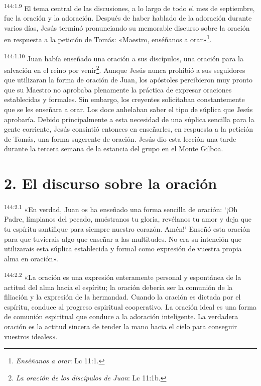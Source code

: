 \par 
\textsuperscript{144:1.9} El tema central de las discusiones, a lo largo de todo el mes de septiembre, fue la oración y la adoración. Después de haber hablado de la adoración durante varios días, Jesús terminó pronunciando su memorable discurso sobre la oración en respuesta a la petición de Tomás: «Maestro, enséñanos a orar»\footnote{\textit{Enséñanos a orar}: Lc 11:1.}.

\par 
\textsuperscript{144:1.10} Juan había enseñado una oración a sus discípulos, una oración para la salvación en el reino por venir\footnote{\textit{La oración de los discípulos de Juan}: Lc 11:1b.}. Aunque Jesús nunca prohibió a sus seguidores que utilizaran la forma de oración de Juan, los apóstoles percibieron muy pronto que su Maestro no aprobaba plenamente la práctica de expresar oraciones establecidas y formales. Sin embargo, los creyentes solicitaban constantemente que se les enseñara a orar. Los doce anhelaban saber el tipo de súplica que Jesús aprobaría. Debido principalmente a esta necesidad de una súplica sencilla para la gente corriente, Jesús consintió entonces en enseñarles, en respuesta a la petición de Tomás, una forma sugerente de oración. Jesús dio esta lección una tarde durante la tercera semana de la estancia del grupo en el Monte Gilboa.

\section*{2. El discurso sobre la oración}
\par 
\textsuperscript{144:2.1} «En verdad, Juan os ha enseñado una forma sencilla de oración: `¡Oh Padre, límpianos del pecado, muéstranos tu gloria, revélanos tu amor y deja que tu espíritu santifique para siempre nuestro corazón. Amén!' Enseñó esta oración para que tuvierais algo que enseñar a las multitudes. No era su intención que utilizarais esta súplica establecida y formal como expresión de vuestra propia alma en oración».

\par 
\textsuperscript{144:2.2} «La oración es una expresión enteramente personal y espontánea de la actitud del alma hacia el espíritu; la oración debería ser la comunión de la filiación y la expresión de la hermandad. Cuando la oración es dictada por el espíritu, conduce al progreso espiritual cooperativo. La oración ideal es una forma de comunión espiritual que conduce a la adoración inteligente. La verdadera oración es la actitud sincera de tender la mano hacia el cielo para conseguir vuestros ideales».

